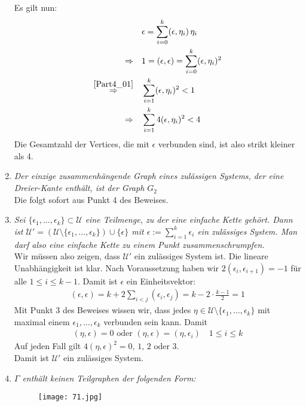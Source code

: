 \documentclass[a4paper,12pt]{article}
\begin{document}
\begin{enumerate}
Es gilt nun:
\begin{align}
&\epsilon = \sum_{i=0}^k (\epsilon,\eta_i)\,\eta_i\notag\\
\Rightarrow\quad &1 = (\epsilon,\epsilon) =  \sum_{i=0}^k (\epsilon,\eta_i)^2\notag\\
\overset{\eqref{Part4_01}}{\Rightarrow} \quad & \sum_{i=1}^k (\epsilon,\eta_i)^2 < 1 \label{winkelabschaetzung} \\
\Rightarrow \quad & \sum_{i=1}^k 4(\epsilon,\eta_i)^2 < 4\notag
\end{align}
Die Gesamtzahl der Vertices, die mit $\epsilon$ verbunden sind, ist also strikt kleiner als 4.

\item \emph{Der einzige zusammenhängende Graph eines zulässigen Systems, der eine Dreier-Kante enthält, ist der Graph $G_2$}\\
Die folgt sofort aus Punkt 4 des Beweises.

\item \emph{Sei $\{\epsilon_1, \ldots , \epsilon_k\} \subset \mathcal{U}$ eine Teilmenge, zu der eine einfache Kette gehört. Dann ist $\mathcal{U'} = ( \mathcal{U} \setminus \{\epsilon_1,\ldots,\epsilon_k \}) \cup \{\epsilon\}$ mit $\epsilon := \sum_{i=1}^k \epsilon_i$ ein zulässiges System. Man darf also eine einfache Kette zu einem Punkt zusammenschrumpfen.}\\
Wir müssen also zeigen, dass $\mathcal{U'}$ ein zulässiges System ist. Die lineare Unabhängigkeit ist klar. Nach Voraussetzung haben wir $2 (\epsilon_i, \epsilon_{i+1}) = -1 $ für alle $1\leq i\leq k-1$. Damit ist $\epsilon$ ein Einheitsvektor:
\begin{align*}
(\epsilon,\epsilon) = k + 2\sum_{i<j} (\epsilon_i,\epsilon_j) = k-2 \cdot\frac{k-1}{2} = 1
\end{align*}
Mit Punkt 3 des Beweises wissen wir, dass jedes $\eta \in \mathcal{U} \setminus \{\epsilon_1,\ldots, \epsilon_k  \}$ mit maximal einem $\epsilon_1,\ldots,\epsilon_k$ verbunden sein kann. Damit
\begin{align*}
(\eta,\epsilon) =0 \text{ oder } (\eta,\epsilon) = (\eta , \epsilon_i)  \quad 1\leq i\leq k
\end{align*}
Auf jeden Fall gilt $4(\eta, \epsilon)^2 = 0,\,1,\,2 \text{ oder } 3$.\\
Damit ist $\mathcal{U'}$ ein zulässiges System.

\item \emph{$\Gamma$ enthält keinen Teilgraphen der folgenden Form:}
\begin{figure}[H]
\centering
\texttt{[image: 71.jpg]}
\end{figure}


\end{enumerate}
\end{document}
